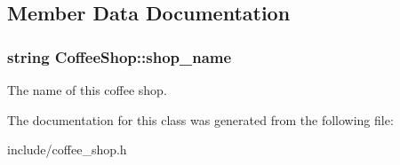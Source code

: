 \subsection{Member Data Documentation}
\subsubsection[{\texorpdfstring{shop\+\_\+name}{shop_name}}]{\setlength{\rightskip}{0pt plus 5cm}string Coffee\+Shop\+::shop\+\_\+name}\hypertarget{classCoffeeShop_ad6efd0c2040c9fd470e2e837b27547e4}{}\label{classCoffeeShop_ad6efd0c2040c9fd470e2e837b27547e4}
The name of this coffee shop. 

The documentation for this class was generated from the following file\+:\begin{DoxyCompactItemize}
\item 
include/coffee\+\_\+shop.\+h\end{DoxyCompactItemize}
